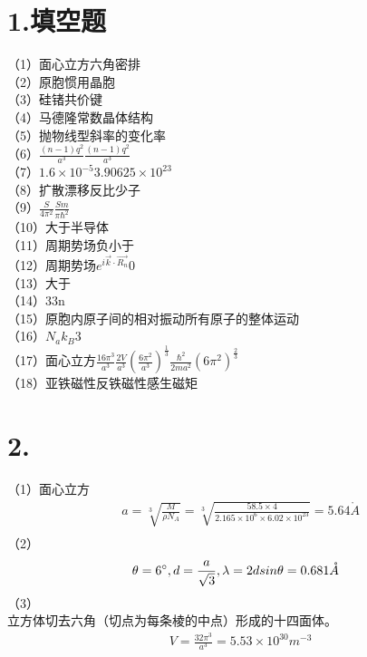 \documentclass[UTF8]{ctexart}
\begin{document}
\section*{1.填空题}
（1）面心立方六角密排\\
（2）原胞惯用晶胞\\
（3）硅锗共价键\\
（4）马德隆常数晶体结构\\
（5）抛物线型斜率的变化率\\
（6）$\frac{(n-1)q^2}{a^3}$$\frac{(n-1)q^2}{a^3}$\\
（7）$1.6\times10^{-5}$$3.90625\times10^{23}$\\
（8）扩散漂移反比少子\\
（9）$\frac{S}{4\pi^2}$$\frac{Sm}{\pi\hbar^2}$\\
（10）大于半导体\\
（11）周期势场负小于\\
（12）周期势场$e^{i\vec{k}\cdot\vec{R_n}}$0\\
（13）大于\\
（14）33n\\
（15）原胞内原子间的相对振动所有原子的整体运动\\
（16）$N_ak_B$3\\
（17）面心立方$\frac{16\pi^3}{a^3}$$\frac{2V}{a^3}$$(\frac{6\pi^2}{a^3})^{\frac{1}{3}}$$\frac{\hbar^2}{2ma^2}(6\pi^2)^{\frac{2}{3}}$\\
（18）亚铁磁性反铁磁性感生磁矩\\
\section*{2.}
（1）面心立方
\begin{equation*}
    \begin{aligned}
        & a=\sqrt[3]{\frac{M}{\rho N_A}}=\sqrt[3]{\frac{58.5\times4}{2.165\times10^6\times6.02\times10^{23}}}=5.64\mathring{A}\\
    \end{aligned}
\end{equation*}
（2）
\begin{equation*}
    \begin{aligned}
        & \theta = 6\degree, d = \frac{a}{\sqrt3}, \lambda = 2dsin\theta = 0.681\mathring{A}\\
    \end{aligned}
\end{equation*}
（3）\\
立方体切去六角（切点为每条棱的中点）形成的十四面体。
\begin{equation*}
    \begin{aligned}
        & V = \frac{32\pi^3}{a^3} = 5.53\times10^{30}m^{-3}\\
    \end{aligned}
\end{equation*}
\end{document}
